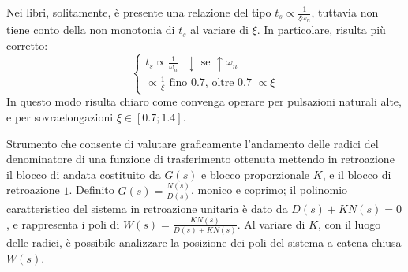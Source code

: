 Nei libri, solitamente, è presente una relazione del tipo \(t_s \propto \frac{1}{\xi \omega_n} \), tuttavia non tiene conto della non monotonia di \(t_s\) al variare di \(\xi\).
In particolare, risulta più corretto:
\[
\begin{cases}
    t_s \propto \frac{1}{\omega_n} \text{ \ } \downarrow \text{\ se \ } \uparrow \omega_n \\
    \propto \frac{1}{\xi} \text{\ fino 0.7, oltre 0.7 \ } \propto \xi
\end{cases}
\]
In questo modo risulta chiaro come convenga operare per pulsazioni naturali alte, e per sovraelongazioni \(\xi \in [0.7;1.4]\).

\label{rlocus}
Strumento che consente di valutare graficamente l'andamento delle radici del denominatore di una funzione di trasferimento ottenuta mettendo in retroazione il blocco di andata costituito da $G(s)$ e blocco proporzionale $K$, e il blocco di retroazione $1$. 
Definito $G(s)=\frac{N(s)}{D(s)}$, monico e coprimo; il polinomio caratteristico del sistema in retroazione unitaria è dato da $D(s) + K N(s) = 0$, e rappresenta i poli di $W(s)=\frac{K N(s)}{D(s) + K N(s)}$. Al variare di $K$, con il luogo delle radici, è possibile analizzare la posizione dei poli del sistema a catena chiusa $W(s)$.

